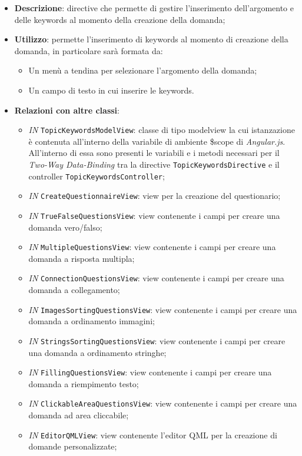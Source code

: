 \begin{itemize}
	\item \textbf{Descrizione}: directive che permette di gestire l'inserimento dell'argomento e delle keywords al momento della creazione della domanda;
	\item \textbf{Utilizzo}: permette l'inserimento di keywords al momento di creazione della domanda, in particolare sarà formata da:
	\begin{itemize}
		\item Un menù a tendina per selezionare l'argomento della domanda;
		\item Un campo di testo in cui inserire le keywords.
	\end{itemize}
	\item \textbf{Relazioni con altre classi}:
	\begin{itemize}
		\item \textit{IN} \texttt{TopicKeywordsModelView}: classe di tipo modelview la cui istanzazione è contenuta all'interno della variabile di ambiente \$scope di \textit{Angular.js}. All'interno di essa sono presenti le variabili e i metodi necessari per il \textit{Two-Way Data-Binding} tra la directive \texttt{TopicKeywordsDirective} e il controller \texttt{TopicKeywordsController};
		\item \textit{IN} \texttt{CreateQuestionnaireView}: view per la creazione del questionario; 
		\item \textit{IN} \texttt{TrueFalseQuestionsView}: view contenente i campi per creare una domanda vero/falso; 
		\item \textit{IN} \texttt{MultipleQuestionsView}: view contenente i campi per creare una domanda a risposta multipla;
		\item \textit{IN} \texttt{ConnectionQuestionsView}: view contenente i campi per creare una domanda a collegamento;
		\item \textit{IN} \texttt{ImagesSortingQuestionsView}: view contenente i campi per creare una domanda a ordinamento immagini;
		\item \textit{IN} \texttt{StringsSortingQuestionsView}: view contenente i campi per creare una domanda a ordinamento stringhe;
		\item \textit{IN} \texttt{FillingQuestionsView}: view contenente i campi per creare una domanda a riempimento testo;
		\item \textit{IN} \texttt{ClickableAreaQuestionsView}: view contenente i campi per creare una domanda ad area cliccabile;
		\item \textit{IN} \texttt{EditorQMLView}: view contenente l'editor QML per la creazione di domande personalizzate;

\end{itemize}
\end{itemize}
